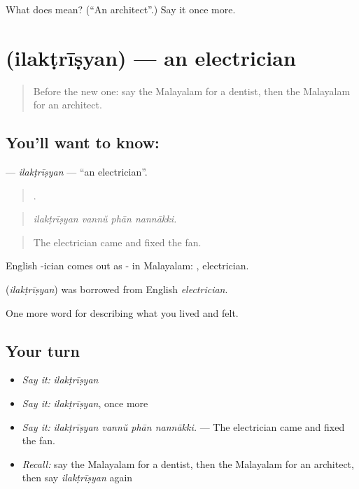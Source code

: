 \begin{tcolorbox}[breakable,colback=teal!4,colframe=teal!35!black,title={Before you move on}]
What does  mean? (\textquotedblleft{}An architect\textquotedblright{}.) Say it once more.
\end{tcolorbox}
\section[\texorpdfstring{\ml{ഇലക്ട്രീഷ്യൻ} (ilakṭrīṣyan)}{ഇലക്ട്രീഷ്യൻ (ilakṭrīṣyan)}]{ (ilakṭrīṣyan) — an electrician}

\label{lesson:ML-C547-ilaktrisyan}



\begin{quote}
Before the new one: say the Malayalam for a dentist, then the Malayalam for an architect.
\end{quote}

\subsection*{You'll want to know: }
\textbf{} — \emph{ilakṭrīṣyan} — \textquotedblleft{}an electrician\textquotedblright{}.

\begin{quote}
   .
\end{quote}

\begin{quote}
\emph{ilakṭrīṣyan vannŭ phān nannākki.}
\end{quote}

\begin{quote}
The electrician came and fixed the fan.
\end{quote}

English -ician comes out as - in Malayalam: , electrician.

\begin{cousinweb}
\textbf{} (\emph{ilakṭrīṣyan}) was borrowed from English \emph{electrician}.
\end{cousinweb}

\begin{grammarlens}[title={What you've built}]
One more word for describing what you lived and felt.
\end{grammarlens}

\subsection*{Your turn}
\begin{itemize}
\raggedright
  \item \emph{Say it:} \emph{ilakṭrīṣyan}
  \item \emph{Say it:} \emph{ilakṭrīṣyan}, once more
  \item \emph{Say it:} \emph{ilakṭrīṣyan vannŭ phān nannākki.} — The electrician came and fixed the fan.
  \item \emph{Recall:} say the Malayalam for a dentist, then the Malayalam for an architect, then say \emph{ilakṭrīṣyan} again
\end{itemize}

